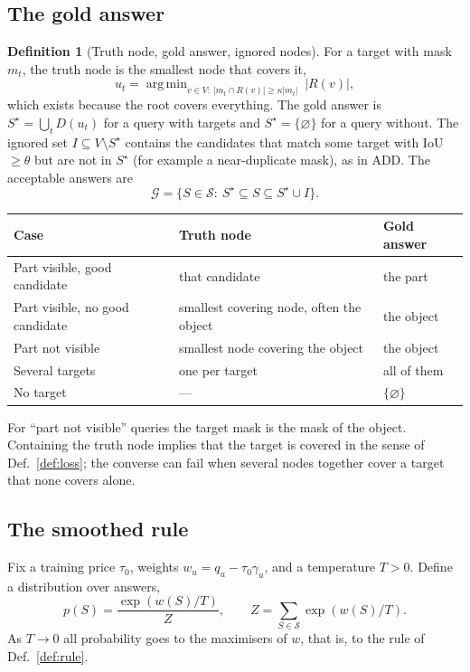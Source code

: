 \documentclass[11pt,a4paper]{article}
\theoremstyle{definition}
\newtheorem{definition}{Definition}
\theoremstyle{remark}
\newcommand{\nul}{\varnothing}
\newcommand{\cS}{\mathcal{S}}
\newcommand{\cG}{\mathcal{G}}
\DeclareMathOperator*{\argmin}{arg\,min}
\begin{document}
\subsection{The gold answer}
\begin{definition}[Truth node, gold answer, ignored nodes]\label{def:truth}
For a target with mask $m_t$, the truth node is the smallest node that covers it,
\[
u_t=\argmin_{v\in V:\ |m_t\cap R(v)|\ge\kappa|m_t|}\ |R(v)| ,
\]
which exists because the root covers everything. The gold answer is $S^\star=\bigcup_tD(u_t)$ for a query with
targets and $S^\star=\{\nul\}$ for a query without. The ignored set $I\subseteq V\setminus S^\star$ contains the
candidates that match some target with IoU $\ge\theta$ but are not in $S^\star$ (for example a near-duplicate mask),
as in ADD. The acceptable answers are
\[
\cG=\{S\in\cS:\ S^\star\subseteq S\subseteq S^\star\cup I\}.
\]
\end{definition}
\begin{center}
\begin{tabular}{L{5.2cm}L{4.6cm}L{4.4cm}}
\toprule
Case & Truth node & Gold answer \\
\midrule
Part visible, good candidate & that candidate & the part \\
Part visible, no good candidate & smallest covering node, often the object & the object \\
Part not visible & smallest node covering the object & the object \\
Several targets & one per target & all of them \\
No target & --- & $\{\nul\}$ \\
\bottomrule
\end{tabular}
\end{center}
For ``part not visible'' queries the target mask is the mask of the object. Containing the truth node implies that
the target is covered in the sense of Def.~\ref{def:loss}; the converse can fail when several nodes together cover a
target that none covers alone.

\subsection{The smoothed rule}
Fix a training price $\tau_0$, weights $w_u=q_u-\tau_0\gamma_u$, and a temperature $T>0$. Define a distribution over
answers,
\begin{equation}\label{eq:gibbs}
p(S)=\frac{\exp(w(S)/T)}{Z},\qquad Z=\sum_{S\in\cS}\exp(w(S)/T).
\end{equation}
As $T\to0$ all probability goes to the maximisers of $w$, that is, to the rule of Def.~\ref{def:rule}.
\end{document}
